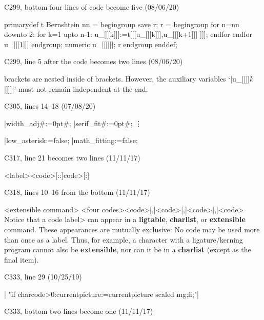 \bugonpage C299, bottom four lines of code become five (08/06/20)

\ninepoint\noindent
\begintt
primarydef t Bernshtein nn = begingroup save r; r =
 begingroup for n=nn downto 2:
  for k=1 upto n-1: u_[[[k]]]:=t[[[u_[[[k]]],u_[[[k+1]]] ]]];
  endfor endfor u_[[[1]]] endgroup; numeric u_[[[]]];
 r endgroup enddef;
\endtt

\bugonpage C299, line 5 after the code becomes two lines (08/06/20)

\ninepoint\noindent
brackets are nested inside of brackets.
However, the auxiliary variables `|u_[[[|$k$|]]]|' must not remain
independent at the end.

\bugonpage C305, lines 14--18 (07/08/20)

\ninepoint\noindent
|width_adj#:=0pt#;         %
\noindent
|serif_fit#:=0pt#;         %
\vskip-3pt\noindent\qquad\vdots\par\noindent
|low_asterisk:=false;      %
\noindent
|math_fitting:=false;      %

\bugonpage C317, line 21 becomes two lines (11/11/17)

\ninepoint\noindent
\beginsyntax
<label>\alt<code>[::]\is\<code>[:]
\endsyntax

\bugonpage C318, lines 10--16 from the bottom (11/11/17)

\ninepoint\noindent
\beginsyntax
<extensible command>
<four codes>\is<code>[,]<code>[,]<code>[,]<code>
\endsyntax
Notice that a \<code label> can appear in a {\bf ligtable}, {\bf charlist}, or
{\bf extensible} command.
 These appearances are mutually exclusive: No code may be
used more than once as a label. Thus, for example, a character with a
ligature/kerning program cannot also be {\bf extensible}, nor can it be
in a {\bf charlist} (except as the final item).

\bugonpage C333, line 29 (10/25/19)

\ninepoint\noindent
|  "if charcode>0:currentpicture:=currentpicture scaled mg;fi;"|

\bugonpage C333, bottom two lines become one (11/11/17)

